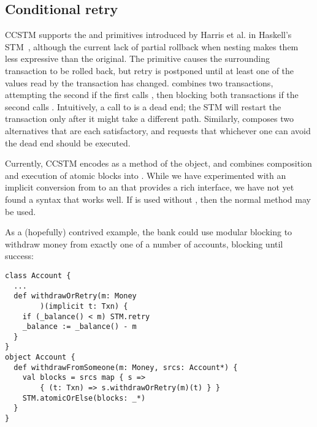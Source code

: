 %

\subsection{Conditional retry}

CCSTM supports the  and  primitives introduced by
Harris et al. in Haskell's STM~\cite{harris05ctm}, although the current
lack of partial rollback when nesting makes them less expressive than the original.
The  primitive causes the surrounding transaction to be rolled
back, but retry is postponed until at least one of the values read by
the transaction has changed.   combines two transactions,
attempting the second if the first calls , then blocking
both transactions if the second calls .  Intuitively, a call
to  is a dead end; the STM will restart the transaction
only after it might take a different path.  Similarly, 
composes two alternatives that are each satisfactory, and requests that
whichever one can avoid the dead end should be executed.

Currently, CCSTM encodes  as a method of the  object, and 
combines composition and execution of atomic blocks into
\code{STM.atomicOrElse[}\code{](blocks: (}\code{ => }\code{)*): }.
While we have experimented with an implicit conversion from 
\code{(}\code{ => }\code{)} to an  that provides a
rich interface, we have not yet found a syntax that works well.  If
 is used without , then the normal 
method may be used.

As a (hopefully) contrived example,
the bank could use modular blocking to withdraw money from exactly one of a number of
accounts, blocking until success:
\lstset{numbers=none}
\lstset{xleftmargin=0.125in}
\begin{lstlisting}
class Account {
  ...
  def withdrawOrRetry(m: Money
        )(implicit t: Txn) {
    if (_balance() < m) STM.retry
    _balance := _balance() - m
  }
}
object Account {
  def withdrawFromSomeone(m: Money, srcs: Account*) {
    val blocks = srcs map { s =>
        { (t: Txn) => s.withdrawOrRetry(m)(t) } }
    STM.atomicOrElse(blocks: _*)
  }
}
\end{lstlisting}
\lstset{numbers=left}
\lstset{xleftmargin=0.25in}


